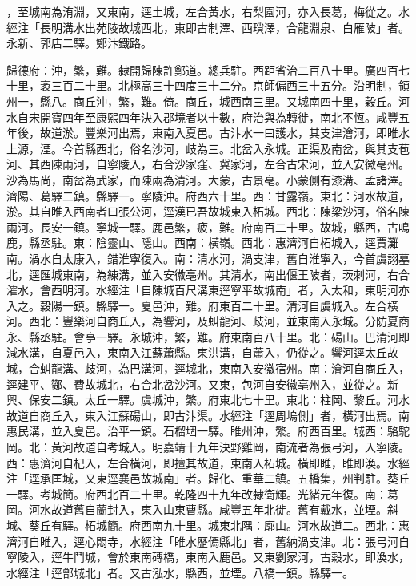 \begin{pinyinscope}
，至城南為洧淵，又東南，逕土城，左合黃水，右梨園河，亦入長葛，梅從之。水經注「長明溝水出苑陵故城西北，東即古制澤、西瑣澤，合龍淵泉、白雁陂」者。永新、郭店二驛。鄭汴鐵路。

歸德府：沖，繁，難。隸開歸陳許鄭道。總兵駐。西距省治二百八十里。廣四百七十里，袤三百二十里。北極高三十四度三十二分。京師偏西三十五分。沿明制，領州一，縣八。商丘沖，繁，難。倚。商丘，城西南三里。又城南四十里，穀丘。河水自宋開寶四年至康熙四年決入郡境者以十數，府治與為轉徙，南北不恆。咸豐五年後，故道淤。豐樂河出焉，東南入夏邑。古汴水一曰護水，其支津澮河，即睢水上源，湮。今首縣西北，俗名沙河，歧為三。北岔入永城。正渠及南岔，與其支苞河、其西陳兩河，自寧陵入，右合沙家窪、冀家河，左合古宋河，並入安徽亳州。沙為馬尚，南岔為武家，而陳兩為清河。大蒙，古景亳。小蒙側有漆溝、孟諸澤。濟陽、葛驛二鎮。縣驛一。寧陵沖。府西六十里。西：甘露嶺。東北：河水故道，淤。其自睢入西南者曰張公河，逕漢已吾故城東入柘城。西北：陳梁沙河，俗名陳兩河。長安一鎮。寧城一驛。鹿邑繁，疲，難。府南百二十里。故城，縣西，古鳴鹿，縣丞駐。東：陰靈山、隱山。西南：橫嶺。西北：惠濟河自柘城入，逕賈灘南。渦水自太康入，錯淮寧復入。南：清水河，渦支津，舊自淮寧入，今首虞詡墓北，逕匯城東南，為練溝，並入安徽亳州。其清水，南出偃王陂者，茨刺河，右合瀖水，會西明河。水經注「自陳城百尺溝東逕寧平故城南」者，入太和，東明河亦入之。穀陽一鎮。縣驛一。夏邑沖，難。府東百二十里。清河自虞城入。左合橫河。西北：豐樂河自商丘入，為響河，及虯龍河、歧河，並東南入永城。分防夏商永、縣丞駐。會亭一驛。永城沖，繁，難。府東南百八十里。北：碭山。巴清河即減水溝，自夏邑入，東南入江蘇蕭縣。東洪溝，自蕭入，仍從之。響河逕太丘故城，合虯龍溝、歧河，為巴溝河，逕城北，東南入安徽宿州。南：澮河自商丘入，逕建平、酂、費故城北，右合北岔沙河。又東，包河自安徽亳州入，並從之。新興、保安二鎮。太丘一驛。虞城沖，繁。府東北七十里。東北：柱岡、黎丘。河水故道自商丘入，東入江蘇碭山，即古汴渠。水經注「逕周塢側」者，橫河出焉。南惠民溝，並入夏邑。治平一鎮。石榴堌一驛。睢州沖，繁。府西百里。城西：駱駝岡。北：黃河故道自考城入。明嘉靖十九年決野雞岡，南流者為張弓河，入寧陵。西：惠濟河自杞入，左合橫河，即擅其故道，東南入柘城。橫即睢，睢即渙。水經注「逕承匡城，又東逕襄邑故城南」者。歸化、重華二鎮。五橋集，州判駐。葵丘一驛。考城簡。府西北百二十里。乾隆四十九年改隸衛輝。光緒元年復。南：葛岡。河水故道舊自蘭封入，東入山東曹縣。咸豐五年北徙。舊有戴水，並堙。斜城、葵丘有驛。柘城簡。府西南九十里。城東北隅：廓山。河水故道二。西北：惠濟河自睢入，逕心悶寺，水經注「睢水歷傿縣北」者，舊納渦支津。北：張弓河自寧陵入，逕牛鬥城，會於東南磚橋，東南入鹿邑。又東劉家河，古穀水，即渙水，水經注「逕鄫城北」者。又古泓水，縣西，並堙。八橋一鎮。縣驛一。


\end{pinyinscope}
